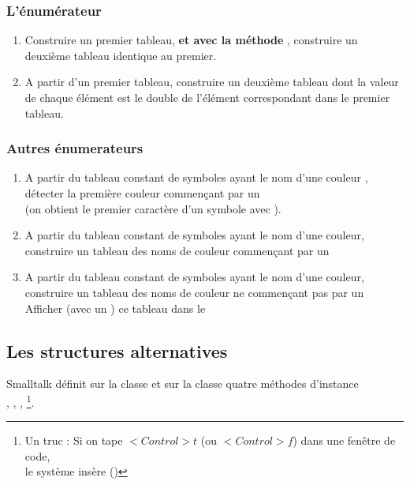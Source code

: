 \subsubsection{L'\'enum\'erateur }
 
\begin{enumerate}
\item
Construire un premier tableau, {\bf et avec la m\'ethode },
construire un deuxi\`eme tableau identique au premier.
\item
A partir d'un premier tableau, construire un deuxi\`eme tableau dont la valeur
de chaque \'el\'ement est le double de l'\'el\'ement correspondant dans le
premier tableau.
\end{enumerate}

\subsubsection{Autres \'enumerateurs}
\begin{enumerate}
\item
A partir du tableau  constant de symboles  ayant le nom
d'une couleur , d\'etecter la premi\`ere couleur
commen\c{c}ant par un \\
(on obtient le premier caract\`ere d'un symbole avec ).
\item
A partir du tableau constant de symboles  ayant le nom
d'une couleur, construire un tableau des noms de couleur
commen\c{c}ant par un 
\item
A partir du tableau constant de symboles  ayant le nom
d'une couleur, construire un tableau des noms de couleur
ne commen\c{c}ant pas par un \\
Afficher (avec un ) ce tableau dans le 
\end{enumerate}

\subsection{Les structures alternatives}

Smalltalk d\'efinit sur la classe  et sur la classe 
quatre m\'ethodes d'instance\\
, , , 
\footnote{Un truc : Si on tape $<Control>t$ (ou $<Control>f$) dans une
 fen\^etre de code,\\le syst\`eme ins\`ere  ()}.

